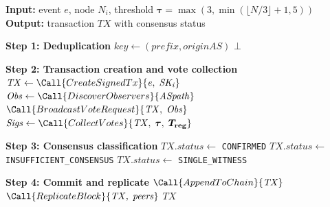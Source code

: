 
\begin{algorithm}[t]
\caption{Observation-Driven Consensus Protocol}
\label{alg:pop_consensus}
\begin{algorithmic}[1]
\Statex \textbf{Input:} event $\mathit{e}$, node $\mathit{N_i}$,
\Statex \hspace{2.1em} threshold $\boldsymbol{\tau} = \max(3, \min(\lfloor N/3 \rfloor + 1, 5))$
\Statex \textbf{Output:} transaction $\mathit{TX}$ with consensus status

\Statex \textbf{Step 1: Deduplication}
\State $\mathit{key} \gets (\mathit{prefix}, \mathit{originAS})$
    \State \Return $\bot$ 
\EndIf

\Statex \textbf{Step 2: Transaction creation and vote collection}
\State $\mathit{TX} \gets \Call{CreateSignedTx}{\mathit{e},\; \mathit{SK_i}}$
\State $\mathit{Obs} \gets \Call{DiscoverObservers}{\mathit{ASpath}}$ 
\State $\Call{BroadcastVoteRequest}{\mathit{TX},\; \mathit{Obs}}$
\State $\mathit{Sigs} \gets \Call{CollectVotes}{\mathit{TX},\; \boldsymbol{\tau},\; \boldsymbol{T_{\mathrm{reg}}}}$ 

\Statex \textbf{Step 3: Consensus classification}
    \State $\mathit{TX}.\mathit{status} \gets$ \texttt{CONFIRMED}
    \State $\mathit{TX}.\mathit{status} \gets$ \texttt{INSUFFICIENT\_CONSENSUS}
\Else
    \State $\mathit{TX}.\mathit{status} \gets$ \texttt{SINGLE\_WITNESS}
\EndIf

\Statex \textbf{Step 4: Commit and replicate}
\State $\Call{AppendToChain}{\mathit{TX}}$
\State $\Call{ReplicateBlock}{\mathit{TX},\; \mathit{peers}}$
\State \Return $\mathit{TX}$

\end{algorithmic}
\end{algorithm}



